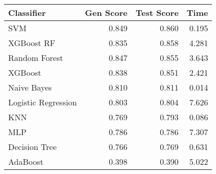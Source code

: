 \begin{tabular}{lrrr}
\toprule
Classifier & Gen Score & Test Score & Time \\
\midrule
SVM & 0.849 & 0.860 & 0.195 \\
XGBoost RF & 0.835 & 0.858 & 4.281 \\
Random Forest & 0.847 & 0.855 & 3.643 \\
XGBoost & 0.838 & 0.851 & 2.421 \\
Naive Bayes & 0.810 & 0.811 & 0.014 \\
Logistic Regression & 0.803 & 0.804 & 7.626 \\
KNN & 0.769 & 0.793 & 0.086 \\
MLP & 0.786 & 0.786 & 7.307 \\
Decision Tree & 0.766 & 0.769 & 0.631 \\
AdaBoost & 0.398 & 0.390 & 5.022 \\
\bottomrule
\end{tabular}
